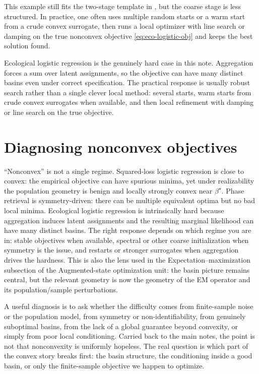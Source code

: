 \documentclass[11pt]{article}
\begin{document}
This example still fits the two-stage template in , but the coarse stage is less structured.
In practice, one often uses multiple random starts or a warm start from a crude convex surrogate, then runs a local optimizer with line search or damping on the true nonconvex objective \eqref{eq:eco-logistic-obj} and keeps the best solution found.

Ecological logistic regression is the genuinely hard case in this note.
Aggregation forces a sum over latent assignments, so the objective can have many distinct basins even under correct specification.
The practical response is usually robust search rather than a single clever local method: several starts, warm starts from crude convex surrogates when available, and then local refinement with damping or line search on the true objective.



\section{Diagnosing nonconvex objectives}
\label{sec:checklist-streamlined}

``Nonconvex'' is not a single regime.
Squared-loss logistic regression is close to convex: the empirical objective can have spurious minima, yet under realizability the population geometry is benign and locally strongly convex near $\beta^\star$.
Phase retrieval is symmetry-driven: there can be multiple equivalent optima but no bad local minima.
Ecological logistic regression is intrinsically hard because aggregation induces latent assignments and the resulting marginal likelihood can have many distinct basins.
The right response depends on which regime you are in: stable objectives when available, spectral or other coarse initialization when symmetry is the issue, and restarts or stronger surrogates when aggregation drives the hardness.
This is also the lens used in the Expectation--maximization subsection of the Augmented-state optimization unit: the basin picture remains central, but the relevant geometry is now the geometry of the EM operator and its population/sample perturbations.

A useful diagnosis is to ask whether the difficulty comes from finite-sample noise or the population model, from symmetry or non-identifiability, from genuinely suboptimal basins, from the lack of a global guarantee beyond convexity, or simply from poor local conditioning.
Carried back to the main notes, the point is not that nonconvexity is uniformly hopeless.
The real question is which part of the convex story breaks first: the basin structure, the conditioning inside a good basin, or only the finite-sample objective we happen to optimize.
\end{document}
